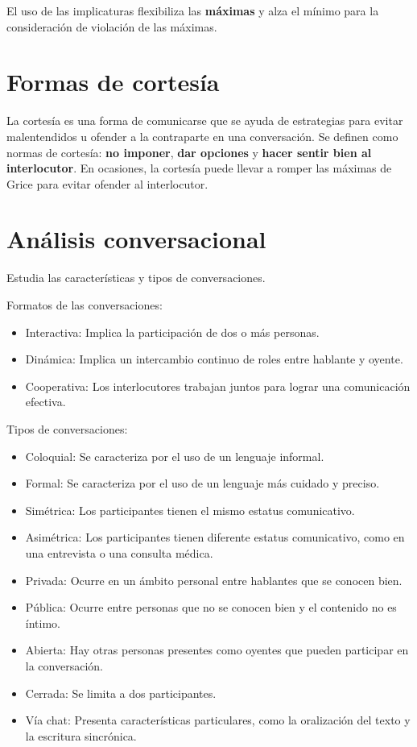 \documentclass{report}
\begin{document}
El uso de las implicaturas flexibiliza las \textbf{máximas} y alza el mínimo para la consideración de violación de las máximas.

\section{Formas de cortesía}
La cortesía es una forma de comunicarse que se ayuda de estrategias para evitar malentendidos u ofender a la contraparte en una conversación.
Se definen como normas de cortesía: \textbf{no imponer}, \textbf{dar opciones} y \textbf{hacer sentir bien al interlocutor}.
En ocasiones, la cortesía puede llevar a romper las máximas de Grice para evitar ofender al interlocutor.

\section{Análisis conversacional}
Estudia las características y tipos de conversaciones.

Formatos de las conversaciones:
\begin{itemize}
    \item Interactiva: Implica la participación de dos o más personas.
    \item Dinámica: Implica un intercambio continuo de roles entre hablante y oyente.
    \item Cooperativa: Los interlocutores trabajan juntos para lograr una comunicación efectiva.
\end{itemize}

Tipos de conversaciones:
\begin{itemize}
    \item Coloquial: Se caracteriza por el uso de un lenguaje informal.
    \item Formal: Se caracteriza por el uso de un lenguaje más cuidado y preciso.
    \item Simétrica: Los participantes tienen el mismo estatus comunicativo.
    \item Asimétrica: Los participantes tienen diferente estatus comunicativo, como en una entrevista o una consulta médica.
    \item Privada: Ocurre en un ámbito personal entre hablantes que se conocen bien.
    \item Pública: Ocurre entre personas que no se conocen bien y el contenido no es íntimo.
    \item Abierta: Hay otras personas presentes como oyentes que pueden participar en la conversación.
    \item Cerrada: Se limita a dos participantes.
    \item Vía chat: Presenta características particulares, como la oralización del texto y la escritura sincrónica.
\end{itemize}
\end{document}
